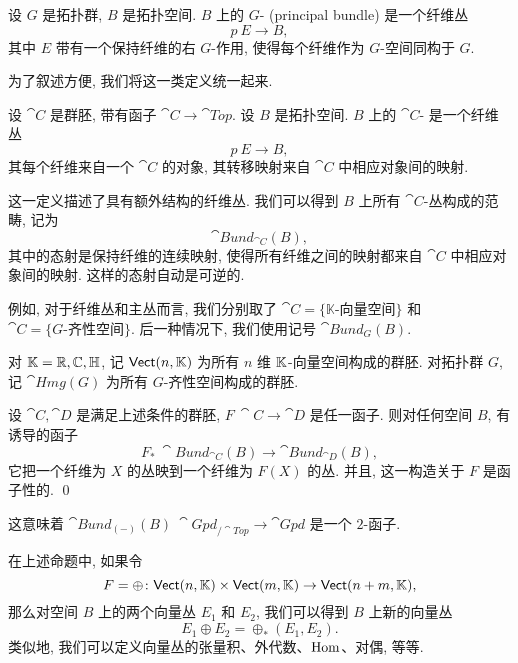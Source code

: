 \begin{definition}
    设 $G$ 是拓扑群, $B$ 是拓扑空间. 
    $B$ 上的 $G$- (principal bundle) 是一个纤维丛
    \[ p \: E \to B, \]
    其中 $E$ 带有一个保持纤维的右 $G$-作用, 
    使得每个纤维作为 $G$-空间同构于 $G$. 
\end{definition}

为了叙述方便, 我们将这一类定义统一起来. 

\begin{definition}
    设 $\cat{C}$ 是群胚, 带有函子 $\cat{C} \to \cat{Top}$. 
    设 $B$ 是拓扑空间. $B$ 上的 $\cat{C}$- 是一个纤维丛
    \[ p \: E \to B, \]
    其每个纤维来自一个 $\cat{C}$ 的对象, 其转移映射来自 $\cat{C}$ 中相应对象间的映射. 
\end{definition}

这一定义描述了具有额外结构的纤维丛. 
我们可以得到 $B$ 上所有 $\cat{C}$-丛构成的范畴, 记为
\[ \cat{Bund}_{\cat{C}} (B), \]
其中的态射是保持纤维的连续映射, 使得所有纤维之间的映射都来自 $\cat{C}$ 中相应对象间的映射.
这样的态射自动是可逆的.

例如, 对于纤维丛和主丛而言, 我们分别取了 $\cat{C} = \{ \mathbb{K}\text{-向量空间} \}$
和 $\cat{C} = \{ G\text{-齐性空间} \}$. 
后一种情况下, 我们使用记号 $\cat{Bund}_G (B)$. 

\begin{notation}
    对 $\mathbb{K} = \mathbb{R}, \mathbb{C}, \mathbb{H}$, 
    记 $\textsf{Vect}(n, \mathbb{K})$ 为所有 $n$ 维 $\mathbb{K}$-向量空间构成的群胚. 
    对拓扑群 $G$, 记 $\cat{Hmg}(G)$ 为所有 $G$-齐性空间构成的群胚. \varqed
\end{notation}

\begin{proposition} \label{thm-1-functor}
    设 $\cat{C}, \cat{D}$ 是满足上述条件的群胚, 
    $F \: \cat{C} \to \cat{D}$ 是任一函子. 
    则对任何空间 $B$, 有诱导的函子
    \[ F_* \: \cat{Bund}_{\cat{C}}(B) \to \cat{Bund}_{\cat{D}}(B), \]
    它把一个纤维为 $X$ 的丛映到一个纤维为 $F(X)$ 的丛. 
    并且, 这一构造关于 $F$ 是函子性的. \qed
\end{proposition}

\begin{remark}
    这意味着 $\cat{Bund}_{(-)}(B) \: \cat{Gpd}_{/\cat{Top}} \to \cat{Gpd}$
    是一个 $2$-函子.  \varqed
\end{remark}

\begin{example}
    在上述命题中, 如果令
    \[
        F = \oplus \colon 
        \textsf{Vect}(n, \mathbb{K}) \times \textsf{Vect}(m, \mathbb{K}) \to 
        \textsf{Vect}(n + m, \mathbb{K}),
    \]
    那么对空间 $B$ 上的两个向量丛 $E_1$ 和 $E_2$, 我们可以得到 $B$ 上新的向量丛
    \[ E_1 \oplus E_2 = \oplus_* (E_1, E_2). \]
    类似地, 我们可以定义向量丛的张量积、外代数、$\operatorname{Hom}$、对偶, 等等.  \varqed
\end{example}

